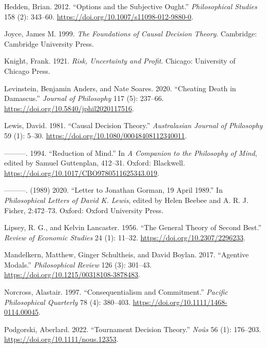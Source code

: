\documentclass[
  12pt,
  letterpaper,
  DIV=11,
  numbers=noendperiod,
  twoside]{scrartcl}
\newlength{\cslhangindent}
\newenvironment{CSLReferences}[2] %
 {\begin{list}{}{%
  \setlength{\itemindent}{0pt}
  \setlength{\leftmargin}{0pt}
  \setlength{\parsep}{0pt}
  \ifodd #1
   \setlength{\leftmargin}{\cslhangindent}
   \setlength{\itemindent}{-1\cslhangindent}
  \fi
  \setlength{\itemsep}{#2\baselineskip}}}
 {\end{list}}
\begin{document}
\begin{CSLReferences}{1}{0}
Hedden, Brian. 2012. {``Options and the Subjective Ought.''}
\emph{Philosophical Studies} 158 (2): 343--60.
\url{https://doi.org/10.1007/s11098-012-9880-0}.

Joyce, James M. 1999. \emph{The Foundations of Causal Decision Theory}.
Cambridge: Cambridge University Press.

Knight, Frank. 1921. \emph{Risk, Uncertainty and Profit}. Chicago:
University of Chicago Press.

Levinstein, Benjamin Anders, and Nate Soares. 2020. {``Cheating Death in
Damascus.''} \emph{Journal of Philosophy} 117 (5): 237--66.
\url{https://doi.org/10.5840/jphil2020117516}.

Lewis, David. 1981. {``Causal Decision Theory.''} \emph{Australasian
Journal of Philosophy} 59 (1): 5--30.
\url{https://doi.org/10.1080/00048408112340011}.

---------. 1994. {``Reduction of Mind.''} In \emph{A Companion to the
Philosophy of Mind}, edited by Samuel Guttenplan, 412--31. Oxford:
Blackwell. \url{https://doi.org/10.1017/CBO9780511625343.019}.

---------. (1989) 2020. {``Letter to Jonathan Gorman, 19 April 1989.''}
In \emph{Philosophical Letters of David {K}. Lewis}, edited by Helen
Beebee and A. R. J. Fisher, 2:472--73. Oxford: Oxford University Press.

Lipsey, R. G., and Kelvin Lancaster. 1956. {``The General Theory of
Second Best.''} \emph{Review of Economic Studies} 24 (1): 11--32.
\url{https://doi.org/10.2307/2296233}.

Mandelkern, Matthew, Ginger Schultheis, and David Boylan. 2017.
{``Agentive Modals.''} \emph{Philosophical Review} 126 (3): 301--43.
\url{https://doi.org/10.1215/00318108-3878483}.

Norcross, Alastair. 1997. {``Consequentialism and Commitment.''}
\emph{Pacific Philosophical Quarterly} 78 (4): 380--403.
\url{https://doi.org/10.1111/1468-0114.00045}.

Podgorski, Aberlard. 2022. {``Tournament Decision Theory.''}
\emph{No{û}s} 56 (1): 176--203.
\url{https://doi.org/10.1111/nous.12353}.


\end{CSLReferences}
\end{document}
